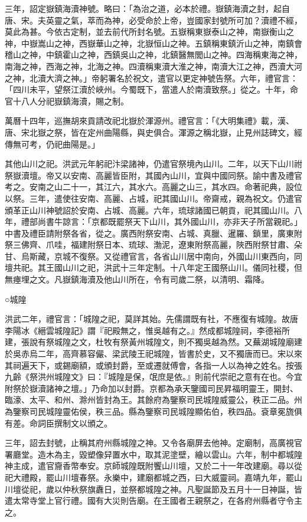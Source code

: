 三年，詔定嶽鎮海瀆神號。略曰：「為治之道，必本於禮。嶽鎮海瀆之封，起自唐、宋。夫英靈之氣，萃而為神，必受命於上帝，豈國家封號所可加？瀆禮不經，莫此為甚。今依古定制，並去前代所封名號。五嶽稱東嶽泰山之神，南嶽衡山之神，中嶽嵩山之神，西嶽華山之神，北嶽恒山之神。五鎮稱東鎮沂山之神，南鎮會稽山之神，中鎮霍山之神，西鎮吳山之神，北鎮醫無閭山之神。四海稱東海之神，南海之神，西海之神，北海之神。四瀆稱東瀆大淮之神，南瀆大江之神，西瀆大河之神，北瀆大濟之神。」帝躬署名於祝文，遣官以更定神號告祭。六年，禮官言：「四川未平，望祭江瀆於峽州。今蜀既下，當遣人於南瀆致祭。」從之。十年，命官十八人分祀嶽鎮海瀆，賜之制。

萬曆十四年，巡撫胡來貢請改祀北嶽於渾源州。禮官言：「《大明集禮》載，漢、唐、宋北嶽之祭，皆在定州曲陽縣，與史俱合。渾源之稱北嶽，止見州誌碑文，經傳無可考，仍祀曲陽是。」

其他山川之祀。洪武元年躬祀汴梁諸神，仍遣官祭境內山川。二年，以天下山川祔祭嶽瀆壇。帝又以安南、高麗皆臣附，其國內山川，宜與中國同祭。諭中書及禮官考之。安南之山二十一，其江六，其水六。高麗之山三，其水四。命著祀典，設位以祭。三年，遣使往安南、高麗、占城，祀其國山川。帝齋戒，親為祝文。仍遣官頒革正山川神號詔於安南、占城、高麗。六年，琉球諸國已朝貢，祀其國山川。八年，禮部尚書牛諒言：「京都既罷祭天下山川，其外國山川，亦非天子所當親祀。」中書及禮臣請附祭各省，從之。廣西附祭安南、占城、真臘、暹羅、鎖里，廣東附祭三佛齊、爪哇，福建附祭日本、琉球、渤泥，遼東附祭高麗，陜西附祭甘肅、朵甘、烏斯藏，京城不復祭。又從禮官言，各省山川居中南向，外國山川東西向，同壇共祀。其王國山川之祀，洪武十三年定制。十八年定王國祭山川。儀同社稷，但無瘞埋之文。凡嶽鎮海瀆及他山川所在，令有司歲二祭，以清明、霜降。

○城隍

洪武二年，禮官言：「城隍之祀，莫詳其始。先儒謂既有社，不應復有城隍。故唐李陽冰《縉雲城隍記》謂『祀殿無之，惟吳越有之。』然成都城隍祠，李德裕所建，張說有祭城隍之文，杜牧有祭黃州城隍文，則不獨吳越為然。又蕪湖城隍廟建於吳赤烏二年，高齊慕容儼、梁武陵王祀城隍，皆書於史，又不獨唐而已。宋以來其祠遍天下，或錫廟額，或頒封爵，至或遷就傅會，各指一人以為神之姓名。按張九齡《祭洪州城隍文》曰：『城隍是保，氓庶是依。』則前代崇祀之意有在也。今宜附祭於嶽瀆諸神之壇。」乃命加以封爵。京都為承天鑒國司民昇福明靈王，開封、臨濠、太平、和州、滁州皆封為王。其餘府為鑒察司民城隍威靈公，秩正二品。州為鑒察司民城隍靈佑侯，秩三品。縣為鑒察司民城隍顯佑伯，秩四品。袞章冕旒俱有差。命詞臣撰制文以頒之。

三年，詔去封號，止稱其府州縣城隍之神。又令各廟屏去他神。定廟制，高廣視官署廳堂。造木為主，毀塑像舁置水中，取其泥塗壁，繪以雲山。六年，制中都城隍神主成，遣官齎香幣奉安。京師城隍既附饗山川壇，又於二十一年改建廟。尋以從祀大禮殿，罷山川壇春祭。永樂中，建廟都城之西，曰大威靈祠。嘉靖九年，罷山川壇從祀，歲以仲秋祭旗纛日，並祭都城隍之神。凡聖誕節及五月十一日神誕，皆遣太常寺堂上官行禮。國有大災則告廟。在王國者王親祭之，在各府州縣者守令主之。

